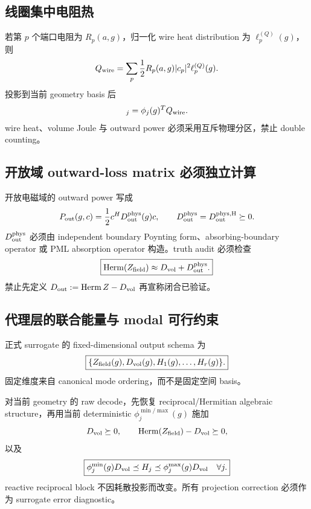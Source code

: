 \subsection{线圈集中电阻热}
若第 $p$ 个端口电阻为 $R_p(a,g)$，归一化 wire heat distribution 为 $\ell_p^{(Q)}(g)$，则
\begin{equation}
Q_{\rm wire}
=\sum_p\frac12R_p(a,g)|c_p|^2\ell_p^{(Q)}(g).
\end{equation}
投影到当前 geometry basis 后
\begin{equation}
[q_{\rm wire}]_j
=\phi_j(g)^TQ_{\rm wire}.
\end{equation}
wire heat、volume Joule 与 outward power 必须采用互斥物理分区，禁止 double counting。

\subsection{开放域 outward-loss matrix 必须独立计算}
开放电磁域的 outward power 写成
\begin{equation}
P_{\rm out}(g,c)=\frac12c^HD_{\rm out}^{\rm phys}(g)c,
\qquad D_{\rm out}^{\rm phys}=D_{\rm out}^{\rm phys,H}\succeq0.
\end{equation}
$D_{\rm out}^{\rm phys}$ 必须由 independent boundary Poynting form、absorbing-boundary operator 或 PML absorption operator 构造。truth audit 必须检查
\begin{equation}
\boxed{
\operatorname{Herm}(Z_{\rm field})
\approx D_{\rm vol}+D_{\rm out}^{\rm phys}.
}
\end{equation}
禁止先定义 $D_{\rm out}:=\operatorname{Herm}Z-D_{\rm vol}$ 再宣称闭合已验证。

\subsection{代理层的联合能量与 modal 可行约束}
正式 surrogate 的 fixed-dimensional output schema 为
\begin{equation}
\boxed{
\{Z_{\rm field}(g),D_{\rm vol}(g),H_1(g),\ldots,H_r(g)\}.
}
\end{equation}
固定维度来自 canonical mode ordering，而不是固定空间 basis。

对当前 geometry 的 raw decode，先恢复 reciprocal/Hermitian algebraic structure，再用当前 deterministic $\phi_j^{\min/\max}(g)$ 施加
\begin{equation}
D_{\rm vol}\succeq0,
\qquad
\operatorname{Herm}(Z_{\rm field})-D_{\rm vol}\succeq0,
\end{equation}
以及
\begin{equation}
\boxed{
\phi_j^{\min}(g)D_{\rm vol}
\preceq H_j
\preceq\phi_j^{\max}(g)D_{\rm vol}
\quad\forall j.
}
\end{equation}
reactive reciprocal block 不因耗散投影而改变。所有 projection correction 必须作为 surrogate error diagnostic。

